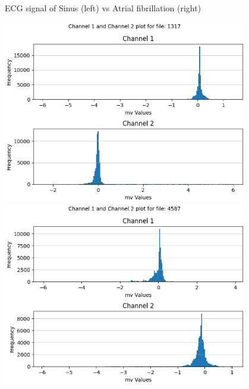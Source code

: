 \begin{figure}[ht!]
\begin{minipage}{.5\textwidth}
            \label{fig:af_4}
    \end{minipage}
    \caption{ECG signal of Sinus (left) vs Atrial fibrillation (right)}
    \label{fig:ecg_sinus_vs_af}
\end{figure}

\begin{figure}[ht!]
\centering
    \begin{minipage}{.5\textwidth}
      \centering
        \includegraphics[width=1.0\linewidth, height=8cm]{BachelorMasterThesis/DataExploration/Figures/sinus/histogram/1317.png}
            \label{fig:sinus_histogram_1}
        \includegraphics[width=1.0\linewidth, height=8cm]{BachelorMasterThesis/DataExploration/Figures/sinus/histogram/4587.png}
            \label{fig:sinus_histogram_2}
    \end{minipage}%
    \begin{minipage}{.5\textwidth}

\end{minipage}
\end{figure}
